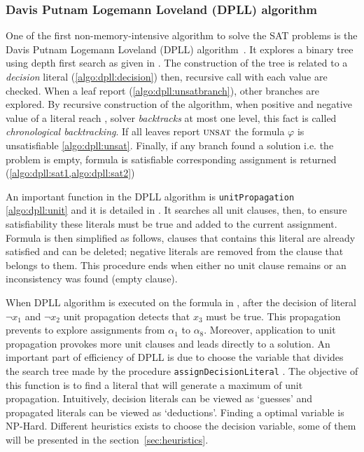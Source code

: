 \subsubsection{Davis Putnam Logemann Loveland (DPLL) algorithm}\label{sec:dpll}
One of the first non-memory-intensive algorithm to solve the SAT problems is 
the Davis Putnam Logemann Loveland (DPLL) algorithm~\cite{dpll_62}. 
It explores a binary tree using depth first search as given in .
The construction of the tree is related to a \emph{decision} literal (\cref{algo:dpll:decision}) then,
recursive call with each value are checked.
When a leaf report \unsat (\cref{algo:dpll:unsatbranch}), other branches are explored.
By recursive construction of the algorithm, when positive and negative value of a literal reach \unsat,
solver \emph{backtracks} at most one level, this fact is called \emph{chronological backtracking}.
If all leaves report $\textsc{unsat}$  the formula $\varphi$ is unsatisfiable \cref{algo:dpll:unsat}.
Finally, if any branch found a solution  i.e. the problem is empty,
formula is satisfiable corresponding assignment is returned (\cref{algo:dpll:sat1,algo:dpll:sat2})

An important function in the DPLL algorithm is \texttt{unitPropagation} \cref{algo:dpll:unit} and
it is detailed in . It searches all unit clauses, then, to ensure satisfiability these literals must be true
and added to the current assignment. Formula is then simplified as follows, clauses that contains this literal are already satisfied
and can be deleted; negative literals are removed from the clause that belongs to them.
This procedure ends when either no unit clause remains or an inconsistency was found (empty clause).


When DPLL algorithm is executed on the formula in , after the decision of literal
$\neg x_1$ and $\neg x_2$ unit propagation detects that $x_3$ must be true. This propagation prevents to 
explore assignments from $\alpha_1 $ to $\alpha_{8}$. Moreover, application to unit propagation 
provokes more unit clauses and leads directly to a solution. 
An important part of efficiency of DPLL is due to choose the variable that divides the search tree made by
the procedure \texttt{assignDecisionLiteral} . The objective of this function 
is to find a literal that will generate a maximum of unit propagation. Intuitively, decision literals 
can be viewed as ‘guesses’ and propagated literals can be viewed as ‘deductions’. Finding a optimal variable
is NP-Hard. Different heuristics exists to choose the decision variable,
some of them will be presented in the section~\ref{sec:heuristics}.

